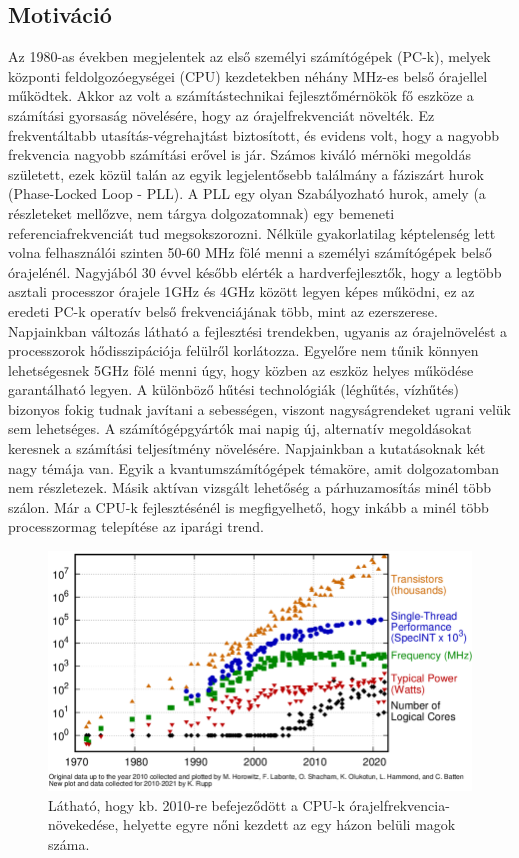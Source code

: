\subsection{Motiváció}
Az 1980-as években megjelentek az első személyi számítógépek (PC-k), melyek központi feldolgozóegységei (CPU) kezdetekben néhány MHz-es belső órajellel működtek. Akkor az volt a számítástechnikai fejlesztőmérnökök fő eszköze a számítási gyorsaság növelésére, hogy az órajelfrekvenciát növelték. Ez frekventáltabb utasítás-végrehajtást biztosított, és evidens volt, hogy a nagyobb frekvencia nagyobb számítási erővel is jár. Számos kiváló mérnöki megoldás született, ezek közül talán az egyik legjelentősebb találmány a fáziszárt hurok (Phase-Locked Loop - PLL). A PLL egy olyan Szabályozható hurok, amely (a részleteket mellőzve, nem tárgya dolgozatomnak) egy bemeneti referenciafrekvenciát tud megsokszorozni. Nélküle gyakorlatilag képtelenség lett volna felhasználói szinten 50-60 MHz fölé menni a személyi számítógépek belső órajelénél. Nagyjából 30 évvel később elérték a hardverfejlesztők, hogy a legtöbb asztali processzor órajele 1GHz és 4GHz között legyen képes működni, ez az eredeti PC-k operatív belső frekvenciájának több, mint az ezerszerese. Napjainkban változás látható a fejlesztési trendekben, ugyanis az órajelnövelést a processzorok hődisszipációja felülről korlátozza. Egyelőre nem tűnik könnyen lehetségesnek 5GHz fölé menni úgy, hogy közben az eszköz helyes működése garantálható legyen. A különböző hűtési technológiák (léghűtés, vízhűtés) bizonyos fokig tudnak javítani a sebességen, viszont nagyságrendeket ugrani velük sem lehetséges. 
A számítógépgyártók mai napig új, alternatív megoldásokat keresnek a számítási teljesítmény növelésére. Napjainkban a kutatásoknak két nagy témája van. Egyik a kvantumszámítógépek témaköre, amit dolgozatomban nem részletezek. Másik aktívan vizsgált lehetőség a párhuzamosítás minél több szálon. Már a CPU-k fejlesztésénél is megfigyelhető, hogy inkább a minél több processzormag telepítése az iparági trend.

\begin{figure}[ht!]
	\centering
	\includegraphics[width=150mm, keepaspectratio]{figures/CPU-cores-trend.png}
	\caption{Látható, hogy kb. 2010-re befejeződött a CPU-k órajelfrekvencia-növekedése, helyette egyre nőni kezdett az egy házon belüli magok száma. \cite{CPUcores} }
\end{figure}

